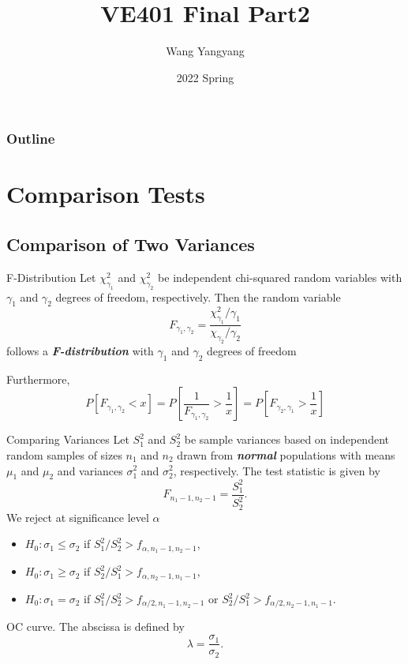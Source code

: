 \documentclass{beamer}
\title{VE401 Final Part2}
\author{Wang Yangyang}
\date{2022 Spring}
\institute{UM-SJTU JI}
\newcommand{\bb}[1]{\textcolor{antiquefuchsia}{\textbf{\textit{#1}}}}
\begin{document}
\maketitle

\begin{frame}
\frametitle{Outline}
\tableofcontents
\end{frame}




\section{Comparison Tests}

\subsection{Comparison of Two Variances}
\begin{frame}{F-Distribution}
Let $\chi_{\gamma_{1}}^{2}$ and $\chi_{\gamma_{2}}^{2}$ be independent chi-squared random variables with $\gamma_{1}$ and $\gamma_{2}$ degrees of freedom, respectively. Then the random variable
$$
F_{\gamma_{1}, \gamma_{2}}=\frac{\chi_{\gamma_{1}}^{2} / \gamma_{1}}{\chi_{\gamma_{2}} / \gamma_{2}}
$$
follows a \bb{F-distribution} with $\gamma_{1}$ and $\gamma_{2}$ degrees of freedom

 Furthermore,
$$
P\left[F_{\gamma_{1}, \gamma_{2}}<x\right]=P\left[\frac{1}{F_{\gamma_{1}, \gamma_{2}}}>\frac{1}{x}\right]=P\left[F_{\gamma_{2}, \gamma_{1}}>\frac{1}{x}\right]
$$
\end{frame}

\begin{frame}{Comparing Variances}
Let $S_{1}^{2}$ and $S_{2}^{2}$ be sample variances based on independent random samples of sizes $n_{1}$ and $n_{2}$ drawn from \bb{normal} populations with means $\mu_{1}$ and $\mu_{2}$ and variances $\sigma_{1}^{2}$ and $\sigma_{2}^{2}$, respectively. The test statistic is given by
$$
F_{n_{1}-1, n_{2}-1}=\frac{S_{1}^{2}}{S_{2}^{2}} .
$$
We reject at significance level $\alpha$
\begin{itemize}
\item $H_{0}: \sigma_{1} \leq \sigma_{2}$ if $S_{1}^{2} / S_{2}^{2}>f_{\alpha, n_{1}-1, n_{2}-1}$,
\item $H_{0}: \sigma_{1} \geq \sigma_{2}$ if $S_{2}^{2} / S_{1}^{2}>f_{\alpha, n_{2}-1, n_{1}-1}$,
\item $H_{0}: \sigma_{1}=\sigma_{2}$ if $S_{1}^{2} / S_{2}^{2}>f_{\alpha / 2, n_{1}-1, n_{2}-1}$ or $S_{2}^{2} / S_{1}^{2}>f_{\alpha / 2, n_{2}-1, n_{1}-1}$. 
\end{itemize}

OC curve. The abscissa is defined by
$$
\lambda=\frac{\sigma_{1}}{\sigma_{2}} .
$$
\end{frame}
\end{document}
